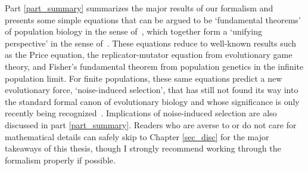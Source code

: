 Part \ref{part_summary} summarizes the major results of our formalism and presents some simple equations that can be argued to be `fundamental theorems' of population biology in the sense of~\cite{queller_fundamental_2017}, which together form a `unifying perspective' in the sense of~\cite{lion_theoretical_2018}. These equations reduce to well-known results such as the Price equation, the replicator-mutator equation from evolutionary game theory, and Fisher's fundamental theorem from population genetics in the infinite population limit. For finite populations, these same equations predict a new evolutionary force, `noise-induced selection', that has still not found its way into the standard formal canon of evolutionary biology and whose significance is only recently being recognized~\citep{constable_demographic_2016,mcleod_social_2019,mazzolini_universality_2022, kuosmanen_turnover_2022}. Implications of noise-induced selection are also discussed in part \ref{part_summary}. Readers who are averse to or do not care for mathematical details can safely skip to Chapter \ref{sec_disc} for the major takeaways of this thesis, though I strongly recommend working through the formalism properly if possible.


